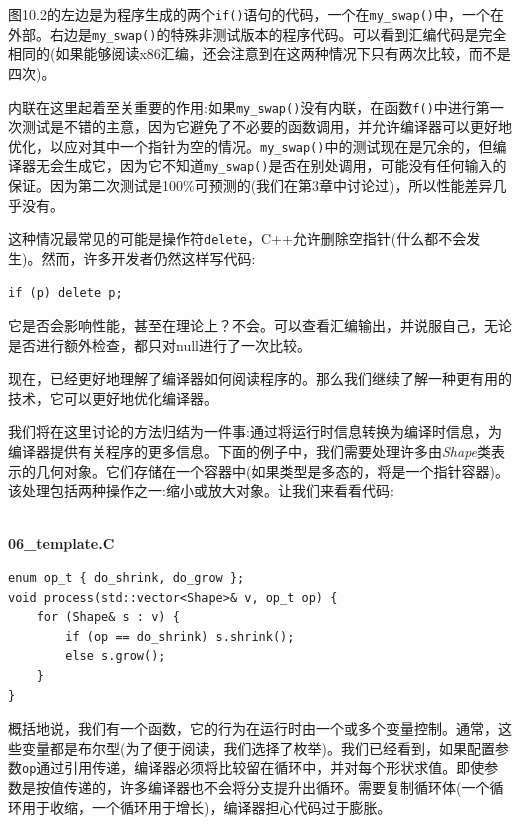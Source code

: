 图10.2的左边是为程序生成的两个\texttt{if()}语句的代码，一个在\texttt{my\_swap()}中，一个在外部。右边是\texttt{my\_swap()}的特殊非测试版本的程序代码。可以看到汇编代码是完全相同的(如果能够阅读x86汇编，还会注意到在这两种情况下只有两次比较，而不是四次)。 

内联在这里起着至关重要的作用:如果\texttt{my\_swap()}没有内联，在函数\texttt{f()}中进行第一次测试是不错的主意，因为它避免了不必要的函数调用，并允许编译器可以更好地优化，以应对其中一个指针为空的情况。\texttt{my\_swap()}中的测试现在是冗余的，但编译器无会生成它，因为它不知道\texttt{my\_swap()}是否在别处调用，可能没有任何输入的保证。因为第二次测试是100\%可预测的(我们在第3章中讨论过)，所以性能差异几乎没有。

这种情况最常见的可能是操作符\texttt{delete}，C++允许删除空指针(什么都不会发生)。然而，许多开发者仍然这样写代码:

\begin{lstlisting}[style=styleCXX]
if (p) delete p; 
\end{lstlisting}

它是否会影响性能，甚至在理论上？不会。可以查看汇编输出，并说服自己，无论是否进行额外检查，都只对null进行了一次比较。 

现在，已经更好地理解了编译器如何阅读程序的。那么我们继续了解一种更有用的技术，它可以更好地优化编译器。


我们将在这里讨论的方法归结为一件事:通过将运行时信息转换为编译时信息，为编译器提供有关程序的更多信息。下面的例子中，我们需要处理许多由\textit{Shape}类表示的几何对象。它们存储在一个容器中(如果类型是多态的，将是一个指针容器)。该处理包括两种操作之一:缩小或放大对象。让我们来看看代码:

\hspace*{\fill} \\ %
\noindent
\textbf{06\_template.C}
\begin{lstlisting}[style=styleCXX]
enum op_t { do_shrink, do_grow };
void process(std::vector<Shape>& v, op_t op) {
	for (Shape& s : v) {
		if (op == do_shrink) s.shrink();
		else s.grow();
	}
}
\end{lstlisting}

概括地说，我们有一个函数，它的行为在运行时由一个或多个变量控制。通常，这些变量都是布尔型(为了便于阅读，我们选择了枚举)。我们已经看到，如果配置参数\texttt{op}通过引用传递，编译器必须将比较留在循环中，并对每个形状求值。即使参数是按值传递的，许多编译器也不会将分支提升出循环。需要复制循环体(一个循环用于收缩，一个循环用于增长)，编译器担心代码过于膨胀。 


